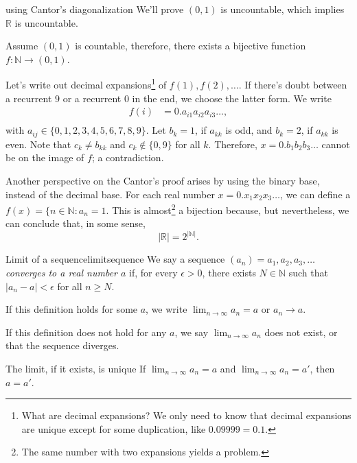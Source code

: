 
\begin{dem}{using Cantor's diagonalization}{}
	We'll prove \((0, 1)\) is uncountable, which implies \(\mathbb{R}\) is uncountable.

	Assume \((0, 1)\) is countable, therefore, there exists a bijective function \(f: \mathbb{N} \to (0, 1)\).

	Let's write out decimal expansions\footnote{What are decimal expansions? We only need to know that decimal expansions are unique except for some duplication, like \(0.09999 = 0.1\).} of \(f(1), f(2), \dots\). If there's doubt between a recurrent \(9\) or a recurrent \(0\) in the end, we choose the latter form. We write
	\begin{align*}
		f(i) &= 0.a_{i1}a_{i2}a_{i3}\dots,\\
	\end{align*}
	with \(a_{ij} \in \{0, 1, 2, 3, 4, 5, 6, 7, 8, 9\}\).
	Let \(b_k = 1\), if \(a_{kk}\) is odd, and \(b_k = 2\), if \(a_{kk}\) is even. Note that \(c_{k} \neq b_{kk}\) and \(c_{k} \notin \{0, 9\}\) for all \(k\).
	Therefore, \(x = 0.b_1b_2b_3\dots\) cannot be on the image of \(f\); a contradiction.
\end{dem}

Another perspective on the Cantor's proof arises by using the binary base, instead of the decimal base. For each real number \(x = 0.x_1x_2x_3\dots\), we can define a \(f(x) = \{n \in \mathbb{N} : a_n = 1\). This is almost\footnote{The same number with two expansions yields a problem.} a bijection because, but nevertheless, we can conclude that, in some sense, \[
		|\mathbb{R}| = 2^{|\mathbb{N}|}.
\]

\begin{defn}{Limit of a sequence}{limitsequence}
	We say a sequence \((a_n) = a_1, a_2, a_3, \dots\) \emph{converges to a real number \(a\)} if, for every \(\epsilon > 0\), there exists \(N \in \mathbb{N}\) such that \(|a_n - a| < \epsilon\) for all \(n \geq N\).

	If this definition holds for some \(a\), we write \(\lim_{n\to\infty} a_n = a\) or \(a_n \to a\).

	If this definition does not hold for any \(a\), we say \(\lim_{n\to\infty} a_n\) does not exist, or that the sequence diverges.
\end{defn}

\begin{prop}{The limit, if it exists, is unique}{}
	If  \(\lim_{n\to\infty} a_n = a\) and  \(\lim_{n\to\infty} a_n = a'\), then \(a = a'\).
\end{prop}

